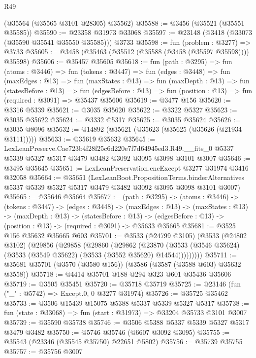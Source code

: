 \begin{lexlean}{R49}
\begin{coremodule}
    (@35564 (@35565 @3101 @28305) @35562)
@35588 := @3456 (@35521 (@35551 @35585))
@35590 := @23358 @31973 @33068
@35597 := @23148 (@3418 (@33073 (@35590 @35541 @35550 @35585))) @3733
@35598 := fun (problem : @3277) => @3733
@35605 := @3458 (@35463 (@35512 (@35588 (@3458 (@35597 @35598)))) @35598)
@35606 := @35457 @35605
@35618 := fun (path : @3295) =>
  fun (atoms : @3446) =>
  fun (tokens : @3447) =>
  fun (edges : @3448) =>
  fun (maxEdges : @13) =>
  fun (maxStates : @13) =>
  fun (maxDepth : @13) =>
  fun (statesBefore : @13) =>
  fun (edgesBefore : @13) => fun (position : @13) => fun (required : @3091) => @35437 @35606
@35619 := @3477 @156
@35620 := @3316 @5339
@35621 := @3035 @35620
@35622 := @3322 @5327
@35623 := @3035 @35622
@35624 := @3332 @5317
@35625 := @3035 @35624
@35626 := @3035 @8096
@35632 := @14892 (@35621 (@35623 (@35625 (@35626 (@21934 @3111)))))
@35633 := @35619 @35632
@35645 := LexLeanPreserve.Cae723b4f28f25c6d220e7f7d64945ed3.R49.__fits_0
    @5337
    @5339
    @5327
    @5317
    @3479
    @3482
    @3092
    @3095
    @3098
    @3101
    @3007
@35646 := @3495 @35645
@35651 := LexLeanPreservation.encExcept @3277 @31974 @3416 @32058
@35664 := @35651
    (LexLeanBoot.PropositionTerms.binderAlternatives
      @5337
      @5339
      @5327
      @5317
      @3479
      @3482
      @3092
      @3095
      @3098
      @3101
      @3007)
@35665 := @35646 @35664
@35677 := (path : @3295) ->
  (atoms : @3446) ->
  (tokens : @3447) ->
  (edges : @3448) ->
  (maxEdges : @13) ->
  (maxStates : @13) ->
  (maxDepth : @13) ->
  (statesBefore : @13) ->
  (edgesBefore : @13) -> (position : @13) -> (required : @3091) -> @35633 @35665
@35681 := @3525 @156 @35632 @35665 @603
@35701 := @3533
    (@24799 @3105)
    (@3533
      (@24802 @3102)
      (@29856
        (@29858
          (@29860
            (@29862
              (@23870
                (@3533 (@3546 @35624) (@3533 (@3549 @35622) (@3533 (@3552 @35620) @14544)))))))))
@35711 := @35681 @35701 (@3570 (@3580 @156)) (@3586 (@3587 (@3588 @603) @35632 @3558))
@35718 := @4414 @35701 @188 @294 @323 @601 @35436 @35606
@35719 := @3505 @35451
@35720 := @35718 @35719
@35725 := @23146 (fun ("_" : @5742) => Except.{0, 0} @3277 @31974)
@35726 := @35725 @35462
@35733 := @3506 @15439 @15075 @5388 @5337 @5339 @5327 @5317
@35738 := fun (state : @33068) => fun (start : @31973) => @33204 @35733 @3101 @3007
@35739 := @35590 @35738
@35746 := @3506 @5388 @5337 @5339 @5327 @5317 @3479 @3482
@35750 := @5746 @35746 (@6607 @3092 @3095)
@35755 := @35543 (@23346 (@35545 @35750) @22651 @5802)
@35756 := @35739 @35755
@35757 := @35756 @3007

\end{coremodule}
\end{lexlean}
